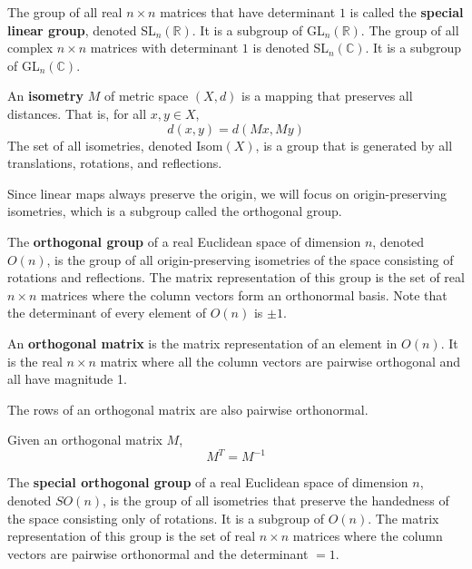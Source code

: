   \begin{definition}
  The group of all real $n \times n$ matrices that have determinant $1$ is called the \textbf{special linear group}, denoted SL$_n (\mathbb{R})$. It is a subgroup of GL$_n (\mathbb{R})$. The group of all complex $n \times n$ matrices with determinant $1$ is denoted SL$_n (\mathbb{C})$. It is a subgroup of GL$_n(\mathbb{C})$. 
  \end{definition}

  \begin{definition}
  An \textbf{isometry} $M$ of metric space $(X, d)$ is a mapping that preserves all distances. That is, for all $x, y \in X$, 
  \[d(x, y) = d(M x, M y) \]
  The set of all isometries, denoted Isom$(X)$, is a group that is generated by all translations, rotations, and reflections. 
  \end{definition}

  Since linear maps always preserve the origin, we will focus on origin-preserving isometries, which is a subgroup called the orthogonal group.

  \begin{definition}
  The \textbf{orthogonal group} of a real Euclidean space of dimension $n$, denoted $O(n)$, is the group of all origin-preserving isometries of the space consisting of rotations and reflections. The matrix representation of this group is the set of real $n \times n$ matrices where the column vectors form an orthonormal basis. Note that the determinant of every element of $O(n)$ is $\pm 1$. 
  \end{definition}

  \begin{definition}
  An \textbf{orthogonal matrix} is the matrix representation of an element in $O(n)$. It is the real $n \times n$ matrix where all the column vectors are pairwise orthogonal and all have magnitude 1. 
  \end{definition}

  \begin{proposition}
  The rows of an orthogonal matrix are also pairwise orthonormal.
  \end{proposition}

  \begin{proposition}
  Given an orthogonal matrix $M$,
  \[M^T = M^{-1}\]
  \end{proposition}

  \begin{definition}
  The \textbf{special orthogonal group} of a real Euclidean space of dimension $n$, denoted $SO(n)$, is the group of all isometries that preserve the handedness of the space consisting only of rotations. It is a subgroup of $O(n)$. The matrix representation of this group is the set of real $n \times n$ matrices where the column vectors are pairwise orthonormal and the determinant $=1$. 
  \end{definition}

